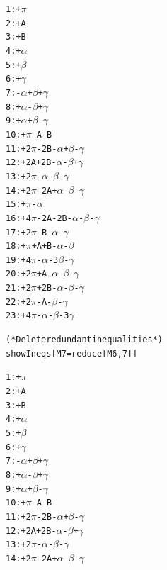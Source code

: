 \documentclass[a4paper, twoside]{article}
\begin{document}
{\begin{alltt}
1: +\(\pi\)
2: +A
3: +B
4: +\(\alpha\)
5: +\(\beta\)
6: +\(\gamma\)
7: -\(\alpha\)+\(\beta\)+\(\gamma\)
8: +\(\alpha\)-\(\beta\)+\(\gamma\)
9: +\(\alpha\)+\(\beta\)-\(\gamma\)
10: +\(\pi\)-A-B
11: +2\(\pi\)-2B-\(\alpha\)+\(\beta\)-\(\gamma\)
12: +2A+2B-\(\alpha\)-\(\beta\)+\(\gamma\)
13: +2\(\pi\)-\(\alpha\)-\(\beta\)-\(\gamma\)
14: +2\(\pi\)-2A+\(\alpha\)-\(\beta\)-\(\gamma\)
15: +\(\pi\)-\(\alpha\)
16: +4\(\pi\)-2A-2B-\(\alpha\)-\(\beta\)-\(\gamma\)
17: +2\(\pi\)-B-\(\alpha\)-\(\gamma\)
18: +\(\pi\)+A+B-\(\alpha\)-\(\beta\)
19: +4\(\pi\)-\(\alpha\)-3\(\beta\)-\(\gamma\)
20: +2\(\pi\)+A-\(\alpha\)-\(\beta\)-\(\gamma\)
21: +2\(\pi\)+2B-\(\alpha\)-\(\beta\)-\(\gamma\)
22: +2\(\pi\)-A-\(\beta\)-\(\gamma\)
23: +4\(\pi\)-\(\alpha\)-\(\beta\)-3\(\gamma\)

(* Delete redundant inequalities *) 
showIneqs[ M7 = reduce[M6, 7] ]

1: +\(\pi\)
2: +A
3: +B
4: +\(\alpha\)
5: +\(\beta\)
6: +\(\gamma\)
7: -\(\alpha\)+\(\beta\)+\(\gamma\)
8: +\(\alpha\)-\(\beta\)+\(\gamma\)
9: +\(\alpha\)+\(\beta\)-\(\gamma\)
10: +\(\pi\)-A-B
11: +2\(\pi\)-2B-\(\alpha\)+\(\beta\)-\(\gamma\)
12: +2A+2B-\(\alpha\)-\(\beta\)+\(\gamma\)
13: +2\(\pi\)-\(\alpha\)-\(\beta\)-\(\gamma\)
14: +2\(\pi\)-2A+\(\alpha\)-\(\beta\)-\(\gamma\)

\end{alltt}  
}

\renewcommand{\baselinestretch}{0.98}
\end{document}

